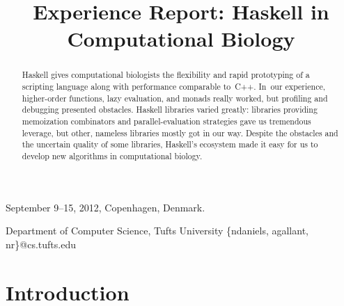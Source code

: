 \documentclass[nonatbib]{sigplanconf}
\begin{document}
 {September 9--15, 2012, Copenhagen, Denmark.}


\title{Experience Report: Haskell in Computational Biology}


           {Department of Computer Science, Tufts University}
           {{\rmfamily\{}ndaniels, agallant, nr{\rmfamily\}}@cs.tufts.edu}


\maketitle

%
%
%
\begin{abstract}
Haskell gives computational biologists
the flexibility and rapid prototyping of a scripting
language along with performance comparable to~C++.
In~our experience, higher-order functions, lazy evaluation, and
monads really worked, but
profiling and debugging presented obstacles.
Haskell libraries varied greatly:
libraries providing memoization combinators and parallel-evaluation
strategies gave us tremendous leverage,
but other, nameless libraries mostly got in our way.
Despite the obstacles and the uncertain quality of some libraries,
Haskell's ecosystem
made it easy for us to develop new algorithms in computational
biology.
\end{abstract}

% 
% 

\section{Introduction}
\end{document}
